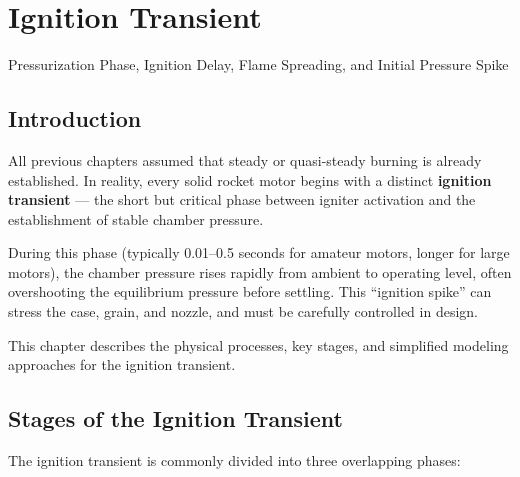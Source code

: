 \documentclass[
  letterpaper,
  DIV=11,
  numbers=noendperiod]{scrreprt}
\begin{document}

\chapter{Ignition Transient}\label{ignition-transient}

Pressurization Phase, Ignition Delay, Flame Spreading, and Initial
Pressure Spike

\hfill\break

\section{Introduction}\label{introduction-6}

All previous chapters assumed that steady or quasi-steady burning is
already established. In reality, every solid rocket motor begins with a
distinct \textbf{ignition transient} --- the short but critical phase
between igniter activation and the establishment of stable chamber
pressure.

During this phase (typically 0.01--0.5 seconds for amateur motors,
longer for large motors), the chamber pressure rises rapidly from
ambient to operating level, often overshooting the equilibrium pressure
before settling. This ``ignition spike'' can stress the case, grain, and
nozzle, and must be carefully controlled in design.

This chapter describes the physical processes, key stages, and
simplified modeling approaches for the ignition transient.

\section{Stages of the Ignition
Transient}\label{stages-of-the-ignition-transient}

The ignition transient is commonly divided into three overlapping
phases:
\end{document}
